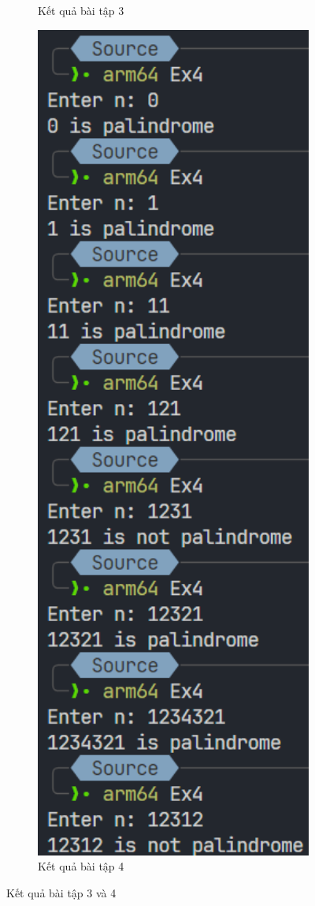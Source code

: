 \documentclass[a4paper,12pt]{report}
\begin{document}
\begin{figure}[!ht]
\begin{subfigure}{0.35\textwidth}
		\caption{Kết quả bài tập 3}
	\end{subfigure}
	\hfill
	\begin{subfigure}{0.42\textwidth}
		\centering
		\includegraphics[width=1\textwidth]{imgs/4.png}
		\caption{Kết quả bài tập 4}
	\end{subfigure}
	\caption{Kết quả bài tập 3 và 4}
\end{figure}
\end{document}
